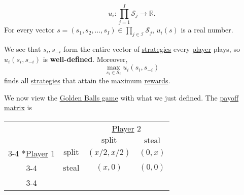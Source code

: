 \begin{prev}
\begin{itemize}
		      \[
			      u_{i}\colon \prod\limits_{j = 1}^{I} \mathcal{S}_{j}\to \mathbb{R}.
		      \]
		      For every vector \(s = (s_1, s_2, \dots , s_I)\in \prod\limits_{j\in \mathcal{I}} \mathcal{S}_j\), \(u_{i}(s)\) is a real number.
	\end{itemize}
	\begin{remark}
		We see that \(s_{i}, s_{-i}\) form the entire vector of \hyperref[def:strategy]{strategies} every \hyperref[def:player]{player} plays, so \(u_{i}(s_{i}, s_{-i})\) is \textbf{well-defined}. Moreover,
		\[
			\max_{s_{i}\in\mathcal{S}_i}u_{i}(s_{i}, s_{-i})
		\]
		finds all \hyperref[def:strategy]{strategies} that attain the maximum \hyperref[def:reward]{rewards}.
	\end{remark}
\end{prev}

\begin{prev}
	We now view the \hyperref[eg:golden-ball]{Golden Balls game} with what we just defined. The \hyperref[def:payoff-matrix]{payoff matrix} is
	\begin{table}[H]
		\centering
		\setlength{\extrarowheight}{2pt}
		\begin{tabular}{cc|c|c|}
			                                               & \multicolumn{1}{c}{} & \multicolumn{2}{c}{\hyperref[def:player]{Player} 2}                                      \\
			                                               & \multicolumn{1}{c}{} & \multicolumn{1}{c}{$\text{split}$}                  & \multicolumn{1}{c}{$\text{steal}$} \\\cline{3-4}
			\multirow{2}*{\hyperref[def:player]{Player} 1} & $\text{split}$       & $(x/2, x/2)$                                        & $(0, x)$                           \\\cline{3-4}
			                                               & $\text{steal}$       & $(x, 0)$                                            & $(0, 0)$                           \\\cline{3-4}
		\end{tabular}
	\end{table}


\end{prev}
